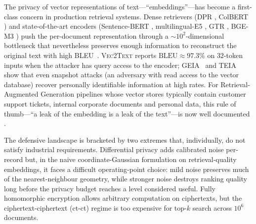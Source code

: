 \documentclass[11pt,a4paper]{article}
\begin{document}
The privacy of vector representations of text---``embeddings''---has become
a first-class concern in production retrieval systems. Dense retrievers
(DPR \cite{ref_dpr}, ColBERT \cite{ref_colbert}) and state-of-the-art
encoders (Sentence-BERT \cite{ref_sbert}, multilingual-E5 \cite{ref_e5},
GTR \cite{ref_gtr}, BGE-M3 \cite{ref_bgem3}) push the per-document
representation through a
$\sim 10^2$-dimensional bottleneck that nevertheless preserves enough
information to reconstruct the original text with high BLEU~\cite{ref_bleu}.
\textsc{Vec2Text} \cite{ref_vec2text} reports
$\mathrm{BLEU} \approx 97.3\%$ on $32$-token inputs when the attacker has
query access to the encoder; \textsc{GEIA}~\cite{ref_geia} and
\textsc{TEIA}~\cite{ref_teia} show that even snapshot attacks
(an adversary with read access to the vector database) recover personally
identifiable information at high rates. For Retrieval-Augmented Generation
pipelines whose vector stores typically contain customer support tickets,
internal corporate documents and personal data, this rule of thumb---``a
leak of the embedding is a leak of the text''---is now well documented
\cite{ref_rag,ref_zeng_rag}.

The defensive landscape is bracketed by two extremes that, individually,
do not satisfy industrial requirements. Differential privacy
\cite{ref_dwork,ref_dpsgd} adds calibrated noise per-record but, in the
naive coordinate-Gaussian formulation on retrieval-quality embeddings, it
faces a difficult operating-point choice: mild noise preserves much of the
nearest-neighbour geometry, while stronger noise destroys ranking quality
long before the privacy budget reaches a level considered useful.
Fully homomorphic encryption \cite{ref_ckks,ref_openfhe}
allows arbitrary computation on ciphertexts, but the
ciphertext-ciphertext (ct-ct) regime is too expensive for top-$k$ search
across $10^6$ documents.
\end{document}
